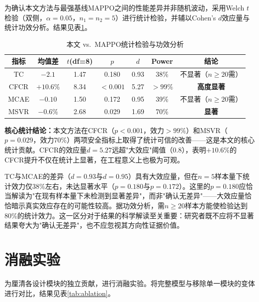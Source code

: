 \documentclass[12pt,a4paper,UTF8]{ctexbook}
\begin{document}
为确认本文方法与最强基线MAPPO之间的性能差异并非随机波动，采用Welch $t$检验（双侧，$\alpha=0.05$，$n_1=n_2=5$）进行统计检验，并辅以Cohen's $d$效应量与统计功效分析。结果见表\ref{tab:ttest}。

\begin{table}[H]
    \centering
    \caption{本文 vs.\ MAPPO统计检验与功效分析}
    \label{tab:ttest}
    \begin{tabular}{|c|c|c|c|c|c|c|}
        \hline
        \textbf{指标} & \textbf{均值差} & \textbf{$t$(df=8)} & \textbf{$p$} & \textbf{$d$} & \textbf{Power} & \textbf{结论} \\
        \hline
        TC & $-2.1$ & 1.47 & 0.180 & 0.93 & 38\% & 不显著（$n\geq20$需） \\
        CFCR & $+10.6\%$ & 8.34 & $<0.001$ & 5.27 & $>99\%$ & \textbf{高度显著} \\
        MCAE & $-0.10$ & 1.50 & 0.172 & 0.95 & 39\% & 不显著（$n\geq20$需） \\
        MSVR & $-0.6\%$ & 2.68 & 0.029 & 1.69 & 70\% & \textbf{显著} \\
        \hline
    \end{tabular}
\end{table}

\textbf{核心统计结论：}本文方法在CFCR（$p<0.001$，效力$>99\%$）和MSVR（$p=0.029$，效力70\%）两项安全指标上取得了统计可信的改善——这是本文的核心统计贡献。CFCR的效应量$d=5.27$远超"大效应"阈值（0.8），表明$+10.6\%$的CFCR提升不仅在统计上显著，在工程意义上也极为可观。

TC与MCAE的差异（$d=0.93$与$d=0.95$）具有大效应量，但在$n=5$样本量下统计效力仅38\%左右，未达显著水平（$p=0.180$与$p=0.172$）。这里的$p=0.180$应恰当解读为"在现有样本量下未检测到显著差异"，而非"确认无差异"——大效应量恰恰暗示真实效应存在的可能性较高。据功效分析，需$n\geq20$样本方能使检验达到80\%的统计效力。这一区分对于结果的科学解读至关重要：研究者既不应将不显著结果夸大为"确认无差异"，也不应忽视其方向性证据价值。

\section{消融实验}

为厘清各设计模块的独立贡献，进行消融实验。将完整模型与移除单一模块的变体进行对比，结果见表\ref{tab:ablation}。
\end{document}
